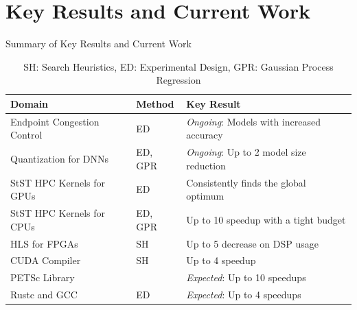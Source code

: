 \documentclass[10pt, compress, aspectratio=169, xcolor={table,usenames,dvipsnames}]{beamer}
\begin{document}
\section{Key Results and Current Work}
\label{sec:orgfb3c47a}
\begin{frame}[label={sec:orgc184d20}]{Summary of Key Results and Current Work}
\small
\begin{table}[htbp]
\caption{SH: Search Heuristics, ED: Experimental Design, GPR: Gaussian Process Regression}
\centering
\begin{tabular}{p{}p{}p{}}
\toprule
Domain & Method & Key Result\\
\midrule
Endpoint Congestion Control & ED & \emph{Ongoing}: Models with increased accuracy\\
Quantization for DNNs & ED, GPR & \emph{Ongoing}: Up to 2\texttimes{} model size reduction\\
\midrule
StST HPC Kernels for GPUs & ED & Consistently finds the global optimum\\
StST HPC Kernels for CPUs & ED, GPR & Up to 10\texttimes{} speedup with a tight budget\\
HLS for FPGAs & SH & Up to 5\texttimes{} decrease on DSP usage\\
CUDA Compiler & SH & Up to 4\texttimes{} speedup\\
\midrule
PETSc Library &  & \emph{Expected}: Up to 10\texttimes{} speedups\\
Rustc and GCC & \multirow{-2}{*}{ED} & \emph{Expected}: Up to 4\texttimes{} speedups\\
\bottomrule
\end{tabular}
\end{table}
\end{frame}
\end{document}
